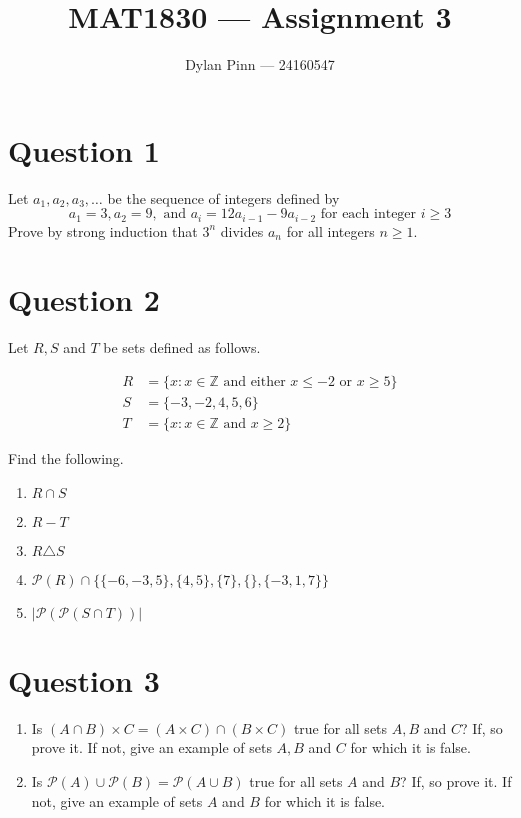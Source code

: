 \documentclass[11pt]{article}
\begin{document}
\title{MAT1830 --- Assignment 3}
\author{Dylan Pinn --- 24160547}
\maketitle

\section*{Question 1}
Let $a_1,a_2,a_3,\dots$ be the sequence of integers defined by
$$a_1=3,a_2=9,\text{ and } a_i=12a_{i-1}-9a_{i-2} \text{ for each integer } i \geq 3$$
Prove by strong induction that $3^n$ divides $a_n$ for all integers $n \geq1$.

\section*{Question 2}
Let $R,S$ and $T$ be sets defined as follows.

\begin{align*}
	R &= \{ x: x \in \mathbb{Z} \text{ and either } x \leq -2 \text{ or } x \geq 5 \} \\
	S &= \{ -3,-2,4,5,6 \} \\
	T &= \{ x: x \in \mathbb{Z} \text{ and } x \geq 2 \}
\end{align*}

Find the following.

\begin{enumerate}[label=(\roman*)]
	\item $R \cap S$
	\item $R - T$
	\item $R \triangle S$
	\item $\mathcal{P} (R) \cap \{ \{-6,-3,5\},\{4,5\},\{7\},\{\},\{-3,1,7\}\}$ 
	\item $|\mathcal{P}(\mathcal{P}(S \cap T))|$
\end{enumerate}

\section*{Question 3}

\begin{enumerate}[label=(\roman*)]
	\item Is $(A\cap B) \times C = (A \times C) \cap (B \times C)$ true for all sets $A,B$ and $C$? If, so prove it. If not, give an example of sets $A,B$ and $C$ for which it is false.
	
	\item Is $\mathcal{P}(A)\cup \mathcal{P}(B) = \mathcal{P}(A \cup B)$ true for all sets $A$ and $B$? If, so prove it. If not, give an example of sets $A$ and $B$ for which it is false.
\end{enumerate}
\end{document}
